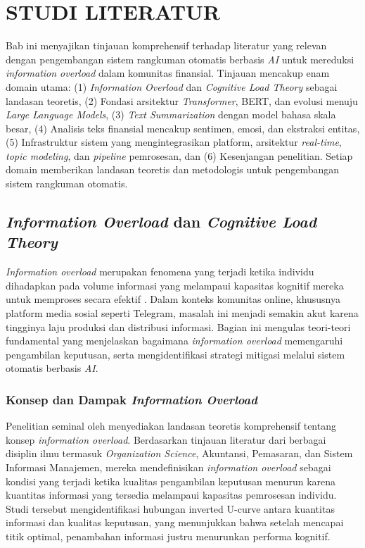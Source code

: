 \chapter{STUDI LITERATUR}
\label{chap:studi-literatur}

Bab ini menyajikan tinjauan komprehensif terhadap literatur yang relevan dengan pengembangan sistem rangkuman otomatis berbasis \textit{AI} untuk mereduksi \textit{information overload} dalam komunitas finansial. Tinjauan mencakup enam domain utama: (1) \textit{Information Overload} dan \textit{Cognitive Load Theory} sebagai landasan teoretis, (2) Fondasi arsitektur \textit{Transformer}, BERT, dan evolusi menuju \textit{Large Language Models}, (3) \textit{Text Summarization} dengan model bahasa skala besar, (4) Analisis teks finansial mencakup sentimen, emosi, dan ekstraksi entitas, (5) Infrastruktur sistem yang mengintegrasikan platform, arsitektur \textit{real-time}, \textit{topic modeling}, dan \textit{pipeline} pemrosesan, dan (6) Kesenjangan penelitian. Setiap domain memberikan landasan teoretis dan metodologis untuk pengembangan sistem rangkuman otomatis.

\section{\textit{Information Overload} dan \textit{Cognitive Load Theory}}
\label{sec:information-overload}

\textit{Information overload} merupakan fenomena yang terjadi ketika individu dihadapkan pada volume informasi yang melampaui kapasitas kognitif mereka untuk memproses secara efektif \autocite{eppler2004}. Dalam konteks komunitas online, khususnya platform media sosial seperti Telegram, masalah ini menjadi semakin akut karena tingginya laju produksi dan distribusi informasi. Bagian ini mengulas teori-teori fundamental yang menjelaskan bagaimana \textit{information overload} memengaruhi pengambilan keputusan, serta mengidentifikasi strategi mitigasi melalui sistem otomatis berbasis \textit{AI}.

\subsection{Konsep dan Dampak \textit{Information Overload}}

Penelitian seminal oleh \textcite{eppler2004} menyediakan landasan teoretis komprehensif tentang konsep \textit{information overload}. Berdasarkan tinjauan literatur dari berbagai disiplin ilmu termasuk \textit{Organization Science}, Akuntansi, Pemasaran, dan Sistem Informasi Manajemen, mereka mendefinisikan \textit{information overload} sebagai kondisi yang terjadi ketika kualitas pengambilan keputusan menurun karena kuantitas informasi yang tersedia melampaui kapasitas pemrosesan individu. Studi tersebut mengidentifikasi hubungan inverted U-curve antara kuantitas informasi dan kualitas keputusan, yang menunjukkan bahwa setelah mencapai titik optimal, penambahan informasi justru menurunkan performa kognitif.


